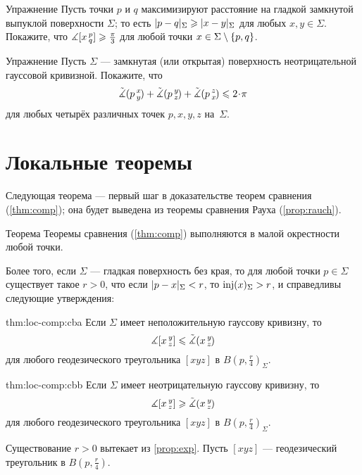 \begin{thm}{Упражнение}\label{ex:diam-angle}
Пусть точки $p$ и $q$ максимизируют расстояние на гладкой замкнутой выпуклой поверхности $\Sigma$;
то есть $\dist{p}{q}\Sigma\z\ge\dist{x}{y}\Sigma$ для любых $x,y\in \Sigma$.
Покажите, что $\measuredangle[x\,{}^{p}_{q}]\geqslant \tfrac\pi3$
для любой точки $x\z\in \Sigma\setminus\{p,q\}$.
\end{thm}

\begin{thm}{Упражнение}\label{ex:sum=<2pi}
Пусть $\Sigma$ --- замкнутая (или открытая) поверхность неотрицательной гауссовой кривизной.
Покажите, что 
\[\modangle pxy+\modangle pyz+\modangle pzx\le2\cdot \pi\]
для любых четырёх различных точек $p,x,y,z$ на~$\Sigma$.
\end{thm}


\section{Локальные теоремы}\label{sec:loc-comp}

Следующая теорема --- первый шаг в доказательстве теорем сравнения (\ref{thm:comp});
она будет выведена из теоремы сравнения Рауха (\ref{prop:rauch}).

\begin{thm}{Теорема}\label{thm:loc-comp}
Теоремы сравнения (\ref{thm:comp}) выполняются в малой окрестности любой точки.

Более того, если $\Sigma$ --- гладкая поверхность без края,
то для любой точки $p\in \Sigma$ существует такое $r>0$, что если $\dist{p}{x}\Sigma<r$, то $\mathop{\rm inj}\nolimits(x)_\Sigma>r$, и справедливы следующие утверждения:

\begin{subthm}{thm:loc-comp:cba}
Если $\Sigma$ имеет неположительную гауссову кривизну, то
\[\measuredangle[x\,{}^{y}_{z}]\leqslant\tilde\measuredangle(x\,{}^{y}_{z}\hspace{-0.2ex})\]
для любого геодезического треугольника $[xyz]$ в $B(p,\tfrac r4)_\Sigma$.
\end{subthm}

\begin{subthm}{thm:loc-comp:cbb}
Если $\Sigma$ имеет неотрицательную гауссову кривизну, то 
\[\measuredangle[x\,{}^{y}_{z}]\geqslant\tilde\measuredangle(x\,{}^{y}_{z}\hspace{-0.2ex})\]
для любого геодезического треугольника $[xyz]$ в $B(p,\tfrac r4)_\Sigma$.
\end{subthm}

\end{thm}

Существование $r>0$ вытекает из \ref{prop:exp}.
Пусть $[xyz]$ --- геодезический треугольник в $B(p,\tfrac{r}4)$.

